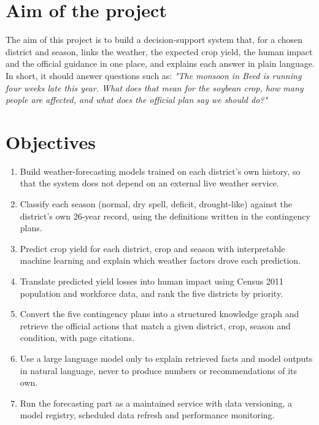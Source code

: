 \section{Aim of the project}
The aim of this project is to build a decision-support system that, for a chosen district and season, links the weather, the expected crop yield, the human impact and the official guidance in one place, and explains each answer in plain language. In short, it should answer questions such as: \emph{"The monsoon in Beed is running four weeks late this year. What does that mean for the soybean crop, how many people are affected, and what does the official plan say we should do?"}

\section{Objectives}
\begin{enumerate}
	\item Build weather-forecasting models trained on each district's own history, so that the system does not depend on an external live weather service.
	\item Classify each season (normal, dry spell, deficit, drought-like) against the district's own 26-year record, using the definitions written in the contingency plans.
	\item Predict crop yield for each district, crop and season with interpretable machine learning and explain which weather factors drove each prediction.
	\item Translate predicted yield losses into human impact using Census 2011 population and workforce data, and rank the five districts by priority.
	\item Convert the five contingency plans into a structured knowledge graph and retrieve the official actions that match a given district, crop, season and condition, with page citations.
	\item Use a large language model only to explain retrieved facts and model outputs in natural language, never to produce numbers or recommendations of its own.
	\item Run the forecasting part as a maintained service with data versioning, a model registry, scheduled data refresh and performance monitoring.
\end{enumerate}

